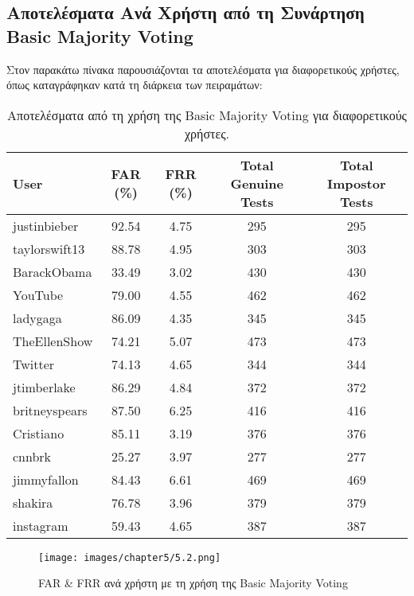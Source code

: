 \subsection{Αποτελέσματα Ανά Χρήστη από τη Συνάρτηση Basic Majority Voting}
\label{subsec:basic_majority_results}

Στον παρακάτω πίνακα παρουσιάζονται τα αποτελέσματα για διαφορετικούς χρήστες, όπως καταγράφηκαν κατά τη διάρκεια των πειραμάτων:

\begin{table}[H]
\centering
\begin{tabular}{|l|c|c|c|c|}
\hline
\textbf{User} & \textbf{FAR (\%)} & \textbf{FRR (\%)} & \textbf{Total Genuine Tests} & \textbf{Total Impostor Tests} \\ \hline
justinbieber & 92.54 & 4.75 & 295 & 295 \\ \hline
taylorswift13 & 88.78 & 4.95 & 303 & 303 \\ \hline
BarackObama & 33.49 & 3.02 & 430 & 430 \\ \hline
YouTube & 79.00 & 4.55 & 462 & 462 \\ \hline
ladygaga & 86.09 & 4.35 & 345 & 345 \\ \hline
TheEllenShow & 74.21 & 5.07 & 473 & 473 \\ \hline
Twitter & 74.13 & 4.65 & 344 & 344 \\ \hline
jtimberlake & 86.29 & 4.84 & 372 & 372 \\ \hline
britneyspears & 87.50 & 6.25 & 416 & 416 \\ \hline
Cristiano & 85.11 & 3.19 & 376 & 376 \\ \hline
cnnbrk & 25.27 & 3.97 & 277 & 277 \\ \hline
jimmyfallon & 84.43 & 6.61 & 469 & 469 \\ \hline
shakira & 76.78 & 3.96 & 379 & 379 \\ \hline
instagram & 59.43 & 4.65 & 387 & 387 \\ \hline
\end{tabular}
\caption{Αποτελέσματα από τη χρήση της Basic Majority Voting για διαφορετικούς χρήστες.}
\label{tab:tab_basic_majority_results}
\end{table}

\begin{figure}[H]
    \centering
    \texttt{[image: images/chapter5/5.2.png]}
    \caption{FAR \& FRR ανά χρήστη με τη χρήση της Basic Majority Voting}
    \label{fig:chapter5_image52}
\end{figure}

